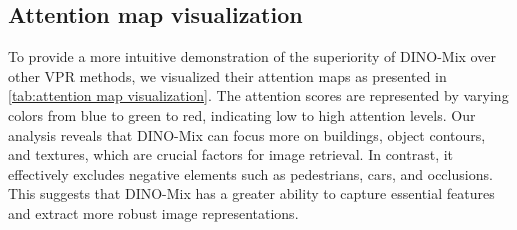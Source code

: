 %
 \subsection{Attention map visualization} 
 \label{attention map visualization}


    
    To provide a more intuitive demonstration of the superiority of DINO-Mix over other VPR methods, we visualized their attention maps as presented in \ref{tab:attention map visualization}. The attention scores are represented by varying colors from blue to green to red, indicating low to high attention levels. Our analysis reveals that DINO-Mix can focus more on buildings, object contours, and textures, which are crucial factors for image retrieval. In contrast, it effectively excludes negative elements such as pedestrians, cars, and occlusions. This suggests that DINO-Mix has a greater ability to capture essential features and extract more robust image representations.